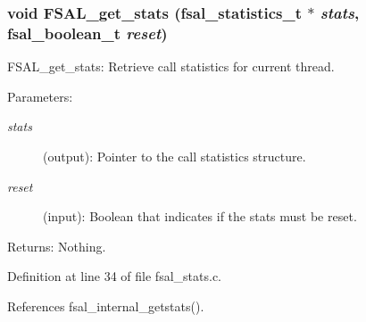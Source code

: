 \subsubsection[{FSAL\_\-get\_\-stats}]{\setlength{\rightskip}{0pt plus 5cm}void FSAL\_\-get\_\-stats (fsal\_\-statistics\_\-t $\ast$ {\em stats}, \/  fsal\_\-boolean\_\-t {\em reset})}\label{fsal__stats_8c_53090fb7553dff52c8eb452df2b62fe9}


FSAL\_\-get\_\-stats: Retrieve call statistics for current thread.

\begin{Desc}
\item[Parameters:]
\begin{description}
\item[{\em stats}](output): Pointer to the call statistics structure. \item[{\em reset}](input): Boolean that indicates if the stats must be reset.\end{description}
\end{Desc}
\begin{Desc}
\item[Returns:]Nothing. \end{Desc}


Definition at line 34 of file fsal\_\-stats.c.

References fsal\_\-internal\_\-getstats().